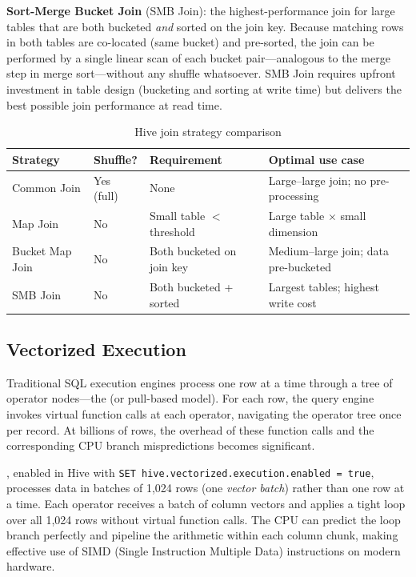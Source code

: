 \textbf{Sort-Merge Bucket Join} (SMB Join): the highest-performance join
for large tables that are both bucketed \emph{and} sorted on the join key.
Because matching rows in both tables are co-located (same bucket) and
pre-sorted, the join can be performed by a single linear scan of each
bucket pair---analogous to the merge step in merge sort---without any
shuffle whatsoever. SMB Join requires upfront investment in table design
(bucketing and sorting at write time) but delivers the best possible
join performance at read time.

\begin{table}[h!t]
\centering
\caption{Hive join strategy comparison}
\label{tab:join-strategies}
\renewcommand{\arraystretch}{1.6}
\begin{tabular}{L{2.4cm} L{1.6cm} L{1.6cm} L{4.6cm}}
\toprule
\textbf{Strategy} & \textbf{Shuffle?} & \textbf{Requirement} & \textbf{Optimal use case} \\
\midrule
Common Join      & Yes (full) & None          & Large–large join; no pre-processing \\
Map Join         & No         & Small table $<$ threshold & Large table $\times$ small dimension \\
Bucket Map Join  & No         & Both bucketed on join key & Medium–large join; data pre-bucketed \\
SMB Join         & No         & Both bucketed + sorted    & Largest tables; highest write cost \\
\bottomrule
\end{tabular}
\end{table}

\subsection{Vectorized Execution}
\label{subsec:vectorized}

Traditional SQL execution engines process one row at a time through
a tree of operator nodes---the  (or pull-based
model). For each row, the query engine invokes virtual function calls
at each operator, navigating the operator tree once per record. At
billions of rows, the overhead of these function calls and the
corresponding CPU branch mispredictions becomes significant.

, enabled in Hive with
\texttt{SET hive.vectorized.execution.enabled = true}, processes data
in batches of 1{,}024 rows (one \emph{vector batch}) rather than one
row at a time. Each operator receives a batch of column vectors and
applies a tight loop over all 1{,}024 rows without virtual function
calls. The CPU can predict the loop branch perfectly and pipeline the
arithmetic within each column chunk, making effective use of SIMD
(Single Instruction Multiple Data) instructions on modern hardware.

